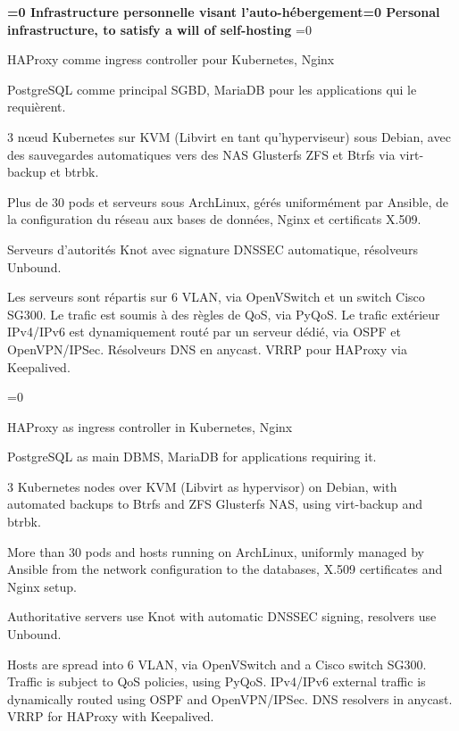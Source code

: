 \documentclass[11pt,a4paper,sans]{moderncv}
\newcommand{\babelFR}[1]{\ifnum\pdfstrcmp{\languagename}{french}=0 {#1}\fi}
\newcommand{\babelEN}[1]{\ifnum\pdfstrcmp{\languagename}{english}=0 {#1}\fi}
\begin{document}
{\textbf{\babelFR{Infrastructure personnelle visant l'auto-hébergement}\babelEN{Personal infrastructure, to satisfy a will of self-hosting}}%
\babelFR{
    \begin{description}[nolistsep]
        \item[Web:] HAProxy comme ingress controller pour Kubernetes, Nginx
        \item[SGBD:] PostgreSQL comme principal SGBD, MariaDB pour
            les applications qui le requièrent.
        \item[Hyperviseur:] 3 nœud Kubernetes sur KVM (Libvirt en tant
            qu'hyperviseur) sous Debian, avec des sauvegardes automatiques vers
            des NAS Glusterfs ZFS et Btrfs via virt-backup et btrbk.
        \item [Orchestration:] Plus de 30 pods et serveurs sous ArchLinux, gérés
            uniformément par Ansible, de la configuration du réseau aux bases
            de données, Nginx et certificats X.509.
        \item[DNS:] Serveurs d'autorités Knot avec signature DNSSEC
            automatique, résolveurs Unbound.
        \item [Réseau:] Les serveurs sont répartis sur 6 VLAN, via OpenVSwitch
            et un switch Cisco SG300. Le trafic est soumis à des règles de QoS,
            via PyQoS. Le trafic extérieur IPv4/IPv6 est dynamiquement routé
            par un serveur dédié, via OSPF et OpenVPN/IPSec. Résolveurs DNS en
            anycast. VRRP pour HAProxy via Keepalived.
    \end{description}
}%
\babelEN{%
    \begin{description}[nolistsep]
        \item[Web:] HAProxy as ingress controller in Kubernetes, Nginx
        \item[Databases:] PostgreSQL as main DBMS, MariaDB for applications
            requiring it.
        \item[Hypervisor:] 3 Kubernetes nodes over KVM (Libvirt as hypervisor)
            on Debian, with automated backups to Btrfs and ZFS Glusterfs NAS,
            using virt-backup and btrbk.
        \item [Management:] More than 30 pods and hosts running on ArchLinux,
            uniformly managed by Ansible from the network configuration to the
            databases, X.509 certificates and Nginx setup.
        \item[DNS:] Authoritative servers use Knot with automatic DNSSEC
            signing, resolvers use Unbound.
        \item [Network:] Hosts are spread into 6 VLAN, via OpenVSwitch and a
            Cisco switch SG300. Traffic is subject to QoS policies, using
            PyQoS. IPv4/IPv6 external traffic is dynamically routed using OSPF
            and OpenVPN/IPSec. DNS resolvers in anycast. VRRP for
            HAProxy with Keepalived.
    \end{description}
}}
\vspace{-1em}
\end{document}
